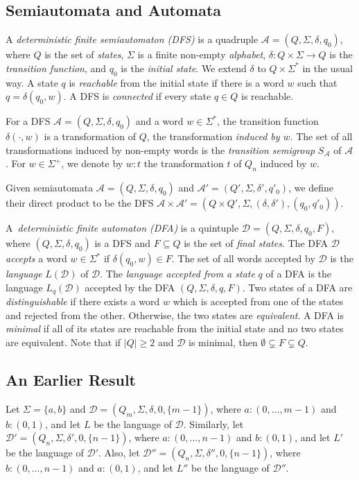 \documentclass{llncs}
\newcommand{\emp}{\emptyset}
\newcommand{\Sig}{\Sigma}
\newcommand{\cA}{{\mathcal A}}
\newcommand{\cD}{{\mathcal D}}
\begin{document}
\subsection{Semiautomata and Automata}
A \emph{deterministic finite semiautomaton (DFS)} is a quadruple $\cA=(Q, \Sig, \delta, q_0)$, where 
$Q$ is the set of \emph{states}, $\Sig$ is a finite non-empty \emph{alphabet}, $\delta\colon Q\times \Sig\to Q$ is the \emph{transition function}, and $q_0$ is the \emph{initial state}. We extend $\delta$ to $Q \times \Sig^*$ in the usual way.
A state $q$ is  \emph{reachable} from the initial state if  there is a word $w$ such that 
$q=\delta(q_0,w)$. 
A DFS is \emph{connected} if every state $q\in Q$ is reachable.

For a  DFS $\cA=(Q,\Sig, \delta,q_0)$ and a word $w \in \Sigma^*$, the transition function $\delta(\cdot, w)$  is a transformation of $Q$, the transformation \emph{induced by $w$}. 
The set of all transformations induced by non-empty words is the \emph{transition semigroup} $S_\cA$ of $\cA$.
For $w\in\Sig^+$, we denote by $w\colon t$ the transformation $t$ of $Q_n$ induced by $w$.

Given semiautomata $\cA=(Q,\Sig, \delta,q_0)$ and $\cA'=(Q',\Sig, \delta',q'_0)$,
we define their direct product to be the DFS
$\cA\times \cA' =(Q\times Q',\Sig, (\delta,\delta') ,(q_0,q'_0))$.


A~\emph{deterministic finite automaton (DFA)} is a quintuple $\cD=(Q, \Sig, \delta, q_0,F)$, where $(Q,\Sig, \delta,q_0)$ is a DFS and 
$F\subseteq Q$ is the set of \emph{final states}. 
The DFA $\cD$ \emph{accepts} a word $w \in \Sigma^*$ if ${\delta}(q_0,w)\in F$. 
The set of all words accepted by $\cD$ is the \emph{language} $L(\cD)$ of $\cD$. 
The \emph{language accepted from a state} $q$ of a DFA is the language $L_{q}(\cD)$ accepted by the DFA
$(Q, \Sigma, \delta, q,F)$.
Two states of a DFA are \emph{distinguishable} if there exists a word $w$
which is accepted from one of the states and rejected from the other. Otherwise,
the two states are \emph{equivalent}.
A DFA is \emph{minimal} if all of its states are reachable from the initial state and no two states are equivalent. 
Note that if $|Q|\ge 2$ and $\cD$ is minimal, then $\emp\subsetneq F\subsetneq Q$.

\subsection{An Earlier Result}
Let  $\Sig=\{a,b\}$ and
$\cD=(Q_m, \Sig, \delta, 0,\{m-1\})$, where  $a\colon (0,\dots,m-1)$ and $b\colon (0,1)$, and let $L$ be the language of $\cD$.
Similarly,  let
$\cD'=(Q_n, \Sig, \delta', 0,\{n-1\})$, where  $a\colon (0,\dots,n-1)$ and $b\colon (0,1)$, and let $L'$ be the language of $\cD'$.
Also,  let
$\cD''=(Q_n, \Sig, \delta'', 0,\{n-1\})$, where  $b\colon (0,\dots,n-1)$ and $a\colon (0,1)$, and let $L''$ be the language of $\cD''$.
\end{document}
